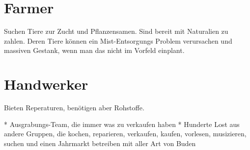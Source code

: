 \documentclass{book}
\begin{document}
\section{Farmer}

Suchen Tiere zur Zucht und Pflanzensamen. Sind bereit mit Naturalien zu zahlen. Deren Tiere können ein Mist-Entsorgungs Problem verursachen und massiven Gestank, wenn man das nicht im Vorfeld einplant.

\section{Handwerker}

Bieten Reperaturen, benötigen aber Rohstoffe.


* Ausgrabungs-Team, die immer was zu verkaufen haben
* Hunderte Lost aus andere Gruppen, die kochen, reparieren, verkaufen, kaufen, vorlesen, musizieren, suchen und einen Jahrmarkt betreiben mit aller Art von Buden
\end{document}
